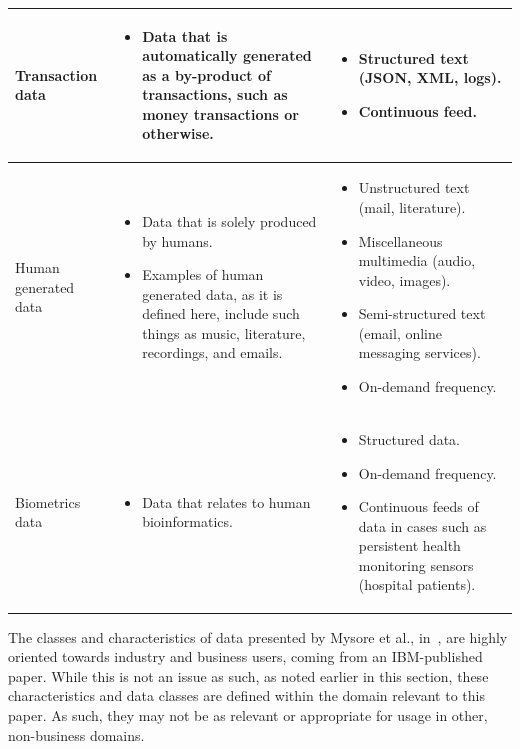 \documentclass[a4paper,11pt]{article}
\begin{document}
\begin{tabular}{ | p{1.5cm} | p{8cm} | p{8cm} | }
  Transaction data
  &
  \begin{itemize}
    \item Data that is automatically generated as a by-product of transactions, such as money transactions or otherwise.
  \end{itemize}
  &
  \begin{itemize}
    \item Structured text (JSON, XML, logs).
    \item Continuous feed.
  \end{itemize}
  \\ \hline

  Human generated data
  &
  \begin{itemize}
    \item Data that is solely produced by humans.
    \item Examples of human generated data, as it is defined here, include such things as music, literature, recordings,
    and emails.
  \end{itemize}
  &
  \begin{itemize}
    \item Unstructured text (mail, literature).
    \item Miscellaneous multimedia (audio, video, images).
    \item Semi-structured text (email, online messaging services).
    \item On-demand frequency.
  \end{itemize}
  \\ \hline

  Biometrics data
  &
  \begin{itemize}
    \item Data that relates to human bioinformatics.
  \end{itemize}
  &
  \begin{itemize}
    \item Structured data.
    \item On-demand frequency.
    \item Continuous feeds of data in cases such as persistent health monitoring sensors (\ie{}hospital patients).
  \end{itemize}
  \\ \hline

\end{tabular}
\endgroup
\hspace*{-3cm}

The classes and characteristics of data presented by Mysore et al., in~\cite{ibm_big_2013}, are highly oriented towards
industry and business users, coming from an IBM-published paper. While this is not an issue as such, as noted earlier
in this section, these characteristics and data classes are defined within the domain relevant to this paper. As such,
they may not be as relevant or appropriate for usage in other, non-business domains.
\end{document}

